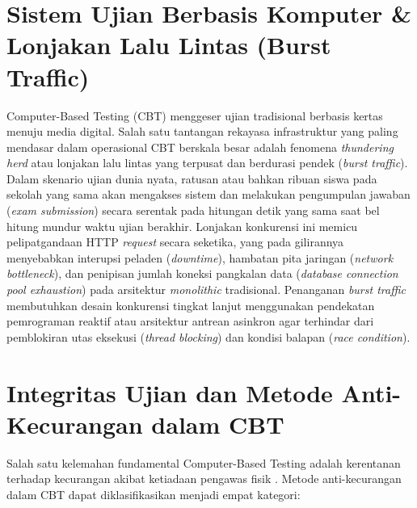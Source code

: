 \section{Sistem Ujian Berbasis Komputer \& Lonjakan Lalu Lintas (Burst Traffic)}

Computer-Based Testing (CBT) menggeser ujian tradisional berbasis kertas menuju media digital. Salah satu tantangan 
rekayasa infrastruktur yang paling mendasar dalam operasional CBT berskala besar adalah fenomena \textit{thundering herd} 
atau lonjakan lalu lintas yang terpusat dan berdurasi pendek (\textit{burst traffic}). Dalam skenario ujian dunia nyata, 
ratusan atau bahkan ribuan siswa pada sekolah yang sama akan mengakses sistem dan melakukan pengumpulan jawaban 
(\textit{exam submission}) secara serentak pada hitungan detik yang sama saat bel hitung mundur waktu ujian berakhir. 
Lonjakan konkurensi ini memicu pelipatgandaan HTTP \textit{request} secara seketika, yang pada gilirannya menyebabkan 
interupsi peladen (\textit{downtime}), hambatan pita jaringan (\textit{network bottleneck}), dan penipisan jumlah koneksi 
pangkalan data (\textit{database connection pool exhaustion}) pada arsitektur \textit{monolithic} tradisional. Penanganan 
\textit{burst traffic} membutuhkan desain konkurensi tingkat lanjut menggunakan pendekatan pemrograman reaktif atau 
arsitektur antrean asinkron agar terhindar dari pemblokiran utas eksekusi (\textit{thread blocking}) dan kondisi balapan 
(\textit{race condition}).

\section{Integritas Ujian dan Metode Anti-Kecurangan dalam CBT}

Salah satu kelemahan fundamental Computer-Based Testing adalah kerentanan terhadap kecurangan akibat ketiadaan pengawas 
fisik \citep{Wibowo2018,Sorensen2018}. Metode anti-kecurangan dalam CBT dapat diklasifikasikan menjadi empat kategori:

